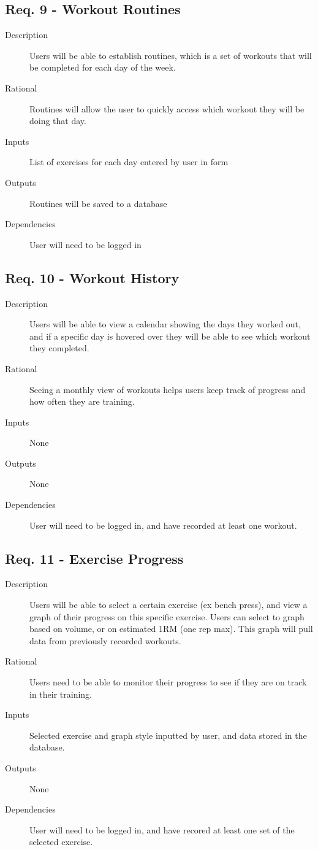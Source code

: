 \documentclass[12pt]{article}
\begin{document}
\subsection{Req. 9 - Workout Routines}
\begin{description}
	\item[Description] Users will be able to establish routines, which is a set of workouts that will be completed for each day of the week.
	\item[Rational] Routines will allow the user to quickly access which workout they will be doing that day.
	\item[Inputs] List of exercises for each day entered by user in form
	\item[Outputs] Routines will be saved to a database
	\item[Dependencies] User will need to be logged in
\end{description}

\subsection{Req. 10 - Workout History}
\begin{description}
	\item[Description] Users will be able to view a calendar showing the days they worked out, and if a specific day is hovered over they will be able to see which workout they completed.
	\item[Rational] Seeing a monthly view of workouts helps users keep track of progress and how often they are training.
	\item[Inputs] None
	\item[Outputs] None
	\item[Dependencies] User will need to be logged in, and have recorded at least one workout.
\end{description}

\subsection{Req. 11 - Exercise Progress}
\begin{description}
	\item[Description] Users will be able to select a certain exercise (ex bench press), and view a graph of their progress on this specific exercise. Users can select to graph based on volume, or on estimated 1RM (one rep max). This graph will pull data from previously recorded workouts.
	\item[Rational] Users need to be able to monitor their progress to see if they are on track in their training.
	\item[Inputs] Selected exercise and graph style inputted by user, and data stored in the database.
	\item[Outputs] None
	\item[Dependencies] User will need to be logged in, and have recored at least one set of the selected exercise.
\end{description}
\end{document}
